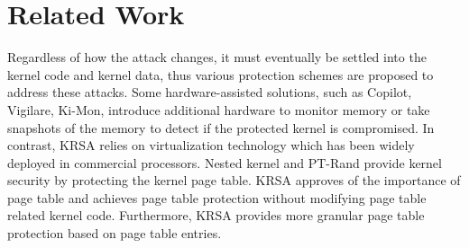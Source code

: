 \documentclass[conference]{IEEEtran}
\begin{document}
\section{Related Work}
Regardless of how the attack changes, it must eventually be settled into the kernel code and kernel data, thus various protection schemes are proposed to address these attacks. 
Some hardware-assisted solutions, such as Copilot\cite{coplilot}, Vigilare\cite{vigilare}, Ki-Mon\cite{ki-mon}, introduce additional hardware to monitor memory or take snapshots of the memory to detect if the protected kernel is compromised. In contrast, KRSA relies on virtualization technology which has been widely deployed in commercial processors.
Nested kernel\cite{nest15} and PT-Rand\cite{ptrand} provide kernel security by protecting the kernel page table. KRSA approves of the importance of page table and achieves page table protection without modifying page table related kernel code. Furthermore, KRSA provides more granular page table protection based on page table entries.

\end{document}
